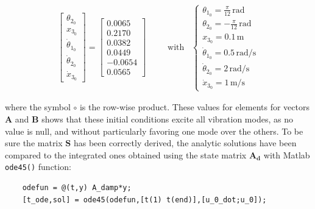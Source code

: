 \documentclass[a4paper,12pt,oneside]{article}
\begin{document}
\begin{align}
\begin{bmatrix}
																			\theta_{2_0} \\
																			x_{3_0}	\\
																			\dot{\theta}_{1_0} \\
																			\dot{\theta}_{2_0} \\
																			\dot{x}_{3_0}
																		\end{bmatrix} =
		\begin{bmatrix}
			0.0065 \\
			0.2170 \\
			0.0382 \\
			0.0449 \\
			-0.0654 \\
			0.0565
		\end{bmatrix} \hspace{30pt}
		\text{with} \hspace{10pt} \begin{cases}
																\theta_{1_0} = \frac{\pi}{12} \, \text{rad} \\
																\theta_{2_0} = -\frac{\pi}{12} \, \text{rad} \\
																x_{3_0} = 0.1 \, \text{m} \\
																\dot{\theta}_{1_0} = 0.5 \, \text{rad/s} \\
																\dot{\theta}_{2_0} = 2 \, \text{rad/s} \\
																\dot{x}_{3_0} = 1 \, \text{m/s}
															\end{cases}
\end{align}

where the symbol $ \circ $ is the row-wise product. These values for elements for vectors $ \mathbf{A} $ and $ \mathbf{B} $ shows that these initial conditions excite all vibration modes, as no value is null, and without particularly favoring one mode over the others. To be sure the matrix $ \mathbf{S} $ has been correctly derived, the analytic solutions have been compared to the integrated ones obtained using the state matrix $ \mathbf{A_d} $ with Matlab \lstinline!ode45()! function:

\begin{lstlisting}
	odefun = @(t,y) A_damp*y;
	[t_ode,sol] = ode45(odefun,[t(1) t(end)],[u_0_dot;u_0]);
\end{lstlisting}

\vspace{10pt}
\end{document}
